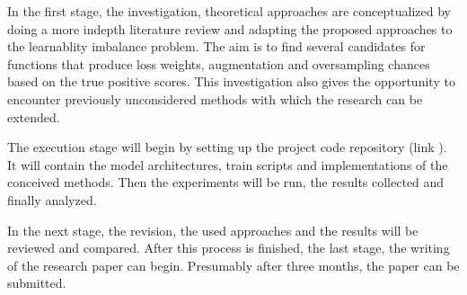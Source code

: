\documentclass[journal]{IEEEtran}
\begin{document}
In the first stage, the investigation, theoretical approaches are conceptualized by doing a more indepth literature review and adapting the proposed approaches to the learnablity imbalance problem. 
The aim is to find several candidates for functions that produce loss weights, augmentation and oversampling chances based on the true positive scores.
This investigation also gives the opportunity to encounter previously unconsidered methods with which the research can be extended.

The execution stage will begin by setting up the project code repository (link \cite{githubResearchProposal}). 
It will contain the model architectures, train scripts and implementations of the conceived methods.
Then the experiments will be run, the results collected and finally analyzed. 

In the next stage, the revision, the used approaches and the results will be reviewed and compared. 
After this process is finished, the last stage, the writing of the research paper can begin. 
Presumably after three months, the paper can be submitted.  

\printbibliography
\end{document}
